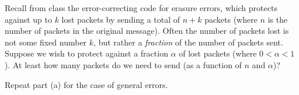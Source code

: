 \documentclass[11pt]{article}
\begin{document}

\begin{Parts}
  
\Part Recall from class the error-correcting code for erasure errors, which
protects against up to $k$ lost packets by sending a total of $n+k$ packets
(where $n$ is the number of packets in the original message).  Often the number
of packets lost is not some fixed number $k$, but rather a \emph{fraction} of
the number of packets sent.  Suppose we wish to protect against a fraction
$\alpha$ of lost packets (where $0 < \alpha < 1$).  At least how many packets do 
we need to send (as a function of $n$ and $\alpha$)?

\Part 
Repeat part (a) for the case of general errors.
\end{Parts}

\end{document}
